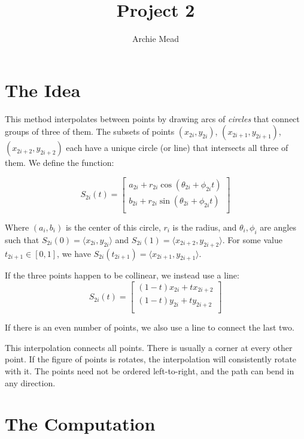 \documentclass[11pt]{article}
\begin{document}
\title{Project 2}
\date{}
\author{Archie Mead}

\maketitle 

\section*{The Idea}

This method interpolates between points by drawing arcs of \emph{circles} that connect groups of three of them. The subsets of points \((x_{2i}, y_{2i})\), \((x_{2i+1}, y_{2i+1})\), \((x_{2i+2}, y_{2i+2})\) each have a unique circle (or line) that intersects all three of them. We define the function:

$$S_{2i}(t) = 
\left[
\begin{array}{c}
a_{2i} + r_{2i} \cos(\theta_{2i} + \phi_{2i} t) \\
b_{2i} + r_{2i} \sin(\theta_{2i} + \phi_{2i} t) \\
\end{array}
\right]
$$

Where \((a_i, b_i)\) is the center of this circle, \(r_i\) is the radius, and \(\theta_i, \phi_i\) are angles such that \(S_{2i}(0) = \langle x_{2i}, y_{2i}\rangle\) and \(S_{2i}(1) = \langle x_{2i+2}, y_{2i+2} \rangle\). For some value \(t_{2i+1} \in [0,1]\), we have \(S_{2i}(t_{2i+1}) = \langle x_{2i+1}, y_{2i+1}\rangle\).

If the three points happen to be collinear, we instead use a line:
$$S_{2i}(t) = 
\left[
\begin{array}{c}
(1 - t) x_{2i} + t x_{2i+2} \\
(1 - t) y_{2i} + t y_{2i+2} \\
\end{array}
\right]
$$

If there is an even number of points, we also use a line to connect the last two. 

This interpolation connects all points. There is usually a corner at every other point. If the figure of points is rotates, the interpolation will consistently rotate with it. The points need not be ordered left-to-right, and the path can bend in any direction. 


\section*{The Computation}
\end{document}
